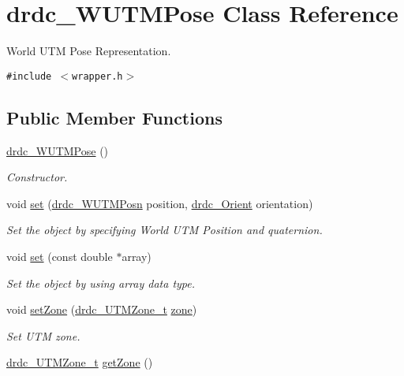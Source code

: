 \hypertarget{classdrdc__WUTMPose}{
\section{drdc\_\-WUTMPose Class Reference}
\label{classdrdc__WUTMPose}
}
World UTM Pose Representation.  


{\tt \#include $<$wrapper.h$>$}

\subsection*{Public Member Functions}
\begin{CompactItemize}
\item 
\hyperlink{classdrdc__WUTMPose_6b93e540205bcbd934e6425ef5b09802}{drdc\_\-WUTMPose} ()
\begin{CompactList}\small\item\em Constructor. \item\end{CompactList}\item 
void \hyperlink{classdrdc__WUTMPose_39ae2ab40c9e7bed0b394649f3b373c2}{set} (\hyperlink{classdrdc__WUTMPosn}{drdc\_\-WUTMPosn} position, \hyperlink{classdrdc__Orient}{drdc\_\-Orient} orientation)
\begin{CompactList}\small\item\em Set the object by specifying World UTM Position and quaternion. \item\end{CompactList}\item 
void \hyperlink{classdrdc__WUTMPose_aede572f074b7051fc391917ed225854}{set} (const double $\ast$array)
\begin{CompactList}\small\item\em Set the object by using array data type. \item\end{CompactList}\item 
void \hyperlink{classdrdc__WUTMPose_43fbeedcfc4efffb0a0949fcd023f6c3}{setZone} (\hyperlink{structdrdc__UTMZone__t}{drdc\_\-UTMZone\_\-t} \hyperlink{classdrdc__WUTMPose_4596093fb33fafbb1257e54ff17bd13e}{zone})
\begin{CompactList}\small\item\em Set UTM zone. \item\end{CompactList}\item 
\hyperlink{structdrdc__UTMZone__t}{drdc\_\-UTMZone\_\-t} \hyperlink{classdrdc__WUTMPose_59bf0d0502a85f8f6447061ceacc34f8}{getZone} ()

\end{CompactItemize}
